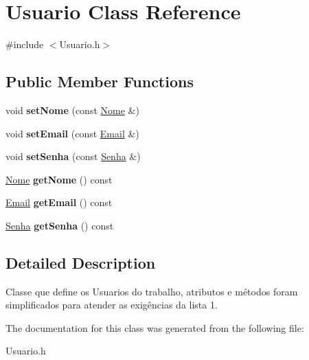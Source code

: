 \hypertarget{classUsuario}{}\section{Usuario Class Reference}
\label{classUsuario}


{\ttfamily \#include $<$Usuario.\+h$>$}

\subsection*{Public Member Functions}
\begin{DoxyCompactItemize}
\item 
void {\bfseries set\+Nome} (const \hyperlink{classNome}{Nome} \&)\hypertarget{classUsuario_a67580c333ab37fda94a3cb7c52121ef2}{}\label{classUsuario_a67580c333ab37fda94a3cb7c52121ef2}

\item 
void {\bfseries set\+Email} (const \hyperlink{classEmail}{Email} \&)\hypertarget{classUsuario_a0371bfcd38d47d092a66d1a7efd5a6b5}{}\label{classUsuario_a0371bfcd38d47d092a66d1a7efd5a6b5}

\item 
void {\bfseries set\+Senha} (const \hyperlink{classSenha}{Senha} \&)\hypertarget{classUsuario_a52d502676a951f13722e22af20c9cea7}{}\label{classUsuario_a52d502676a951f13722e22af20c9cea7}

\item 
\hyperlink{classNome}{Nome} {\bfseries get\+Nome} () const \hypertarget{classUsuario_a8954348c664f0e3899c24b4714215d4f}{}\label{classUsuario_a8954348c664f0e3899c24b4714215d4f}

\item 
\hyperlink{classEmail}{Email} {\bfseries get\+Email} () const \hypertarget{classUsuario_a21c6577c69adeb18b320dd6182d5f5bd}{}\label{classUsuario_a21c6577c69adeb18b320dd6182d5f5bd}

\item 
\hyperlink{classSenha}{Senha} {\bfseries get\+Senha} () const \hypertarget{classUsuario_a47966fd8cddaa99a19419a54560d7ff6}{}\label{classUsuario_a47966fd8cddaa99a19419a54560d7ff6}

\end{DoxyCompactItemize}


\subsection{Detailed Description}
Classe que define os Usuarios do trabalho, atributos e métodos foram simplificados para atender as exigências da lista 1. 

The documentation for this class was generated from the following file\+:\begin{DoxyCompactItemize}
\item 
Usuario.\+h\end{DoxyCompactItemize}
